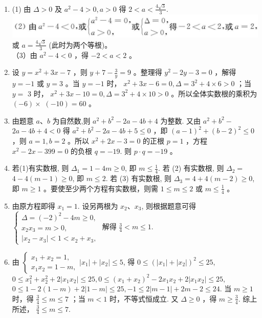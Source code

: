 \documentclass[10pt]{article}
\begin{document}
\begin{enumerate}
  \item (1) 由 $\Delta>0$ 及 $a^{2}-4>0, a>0$ 得 $2<a<\frac{4 \sqrt{3}}{3}$.\\
\includegraphics[max width=\textwidth]{2024_10_30_1bf34f7aeb61f11d11d3g-115}或 $a=\frac{4 \sqrt{3}}{3}$ (此时为两个等根)。\\
（3）由 $a^{2}-4<0$ ，得 $-2<a<2$ 。
  \item 设 $y=x^{2}+3 x-7$ ，则 $y+7-\frac{3}{y}=9$ 。整理得 $y^{2}-2 y-3=0$ ，解得\\
$y=-1$ 或 $y=3$ 。当 $y=-1$ 时， $x^{2}+3 x-6=0, \Delta=3^{2}+4 \times 6>0$ ；当 $y=$ 3 时， $x^{2}+3 x-10=0, \Delta=3^{2}+4 \times 10>0$ 。所以全体实数根的乘积为 $(-6) \times$ $(-10)=60$ 。
  \item 由题意 $a 、 b$ 为自然数,则 $a^{2}+b^{2}-2 a-4 b+4$ 为整数. 又由 $a^{2}+b^{2}-$ $2 a-4 b+4<0$ 得 $a^{2}+b^{2}-2 a-4 b+5 \leqslant 0$ ，即 $(a-1)^{2}+(b-2)^{2} \leqslant 0$ ，则 $a=1, b=2$ 。所以 $x^{2}+2 x-3=0$ 的正根 $p=1$ ，方程 $x^{2}-2 x-399=0$ 的负根 $q=-19$. 则 $p \cdot q=-19$ 。
  \item 若(1)有实数根, 则 $\Delta_{1}=1-4 m \geqslant 0$, 即 $m \leqslant \frac{1}{4}$. 若 (2) 有实数根, 则 $\Delta_{2}=$ $4-4(m-1) \geqslant 0$, 即 $m \leqslant 2$. 若 (3) 有实数根, 则 $\Delta_{3}=4+4(m-2) \geqslant 0$, 即 $m \geqslant 1$ 。要使至少两个方程有实数根，则需 $1 \leqslant m \leqslant 2$ 或 $m \leqslant \frac{1}{4}$ 。
  \item 由原方程即得 $x_{1}=1$. 设另两根为 $x_{2} 、 x_{3}$, 则根据题意可得 $\left\{\begin{array}{l}\Delta=(-2)^{2}-4 m \geqslant 0, \\ x_{2} x_{3}=m>0, \\ \left|x_{2}-x_{3}\right|<1<x_{2}+x_{3},\end{array}\right.$ 解得 $\frac{3}{4}<m \leqslant 1$.
  \item 由 $\left\{\begin{array}{l}x_{1}+x_{2}=1, \\ x_{1} x_{2}=1-m,\end{array}\left|x_{1}\right|+\left|x_{2}\right| \leqslant 5\right.$, 得 $0 \leqslant\left(\left|x_{1}\right|+\left|x_{2}\right|\right)^{2} \leqslant 25$, $0 \leqslant x_{1}^{2}+x_{2}^{2}+2\left|x_{1} x_{2}\right| \leqslant 25,0 \leqslant\left(x_{1}+x_{2}\right)^{2}-2 x_{1} x_{2}+2\left|x_{1} x_{2}\right| \leqslant 25$, $0 \leqslant 1-2(1-m)+2|1-m| \leqslant 25,-1 \leqslant 2|m-1|+2 m-2 \leqslant 24$. 当 $m \geqslant 1$时，得 $\frac{3}{4} \leqslant m \leqslant 7$ ；当 $m<1$ 时，不等式恒成立. 又 $\Delta \geqslant 0$ ，得 $m \geqslant \frac{3}{4}$. 综上所述， $\frac{3}{4} \leqslant m \leqslant 7$.

\end{enumerate}
\end{document}
